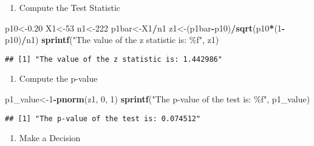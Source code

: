 \documentclass[
]{article}
\newenvironment{Shaded}{\begin{snugshade}}{\end{snugshade}}
\newcommand{\DecValTok}[1]{\textcolor[rgb]{0.00,0.00,0.81}{#1}}
\newcommand{\FloatTok}[1]{\textcolor[rgb]{0.00,0.00,0.81}{#1}}
\newcommand{\FunctionTok}[1]{\textcolor[rgb]{0.13,0.29,0.53}{\textbf{#1}}}
\newcommand{\NormalTok}[1]{#1}
\newcommand{\OtherTok}[1]{\textcolor[rgb]{0.56,0.35,0.01}{#1}}
\newcommand{\SpecialCharTok}[1]{\textcolor[rgb]{0.81,0.36,0.00}{\textbf{#1}}}
\newcommand{\StringTok}[1]{\textcolor[rgb]{0.31,0.60,0.02}{#1}}
\providecommand{\tightlist}{%
  \setlength{\itemsep}{0pt}\setlength{\parskip}{0pt}}
\begin{document}
\begin{enumerate}
\def\labelenumi{\arabic{enumi}.}
\setcounter{enumi}{1}
\tightlist
\item
  Compute the Test Statistic
\end{enumerate}

\begin{Shaded}
\begin{Highlighting}[]
\NormalTok{p10}\OtherTok{\textless{}{-}}\FloatTok{0.20}
\NormalTok{X1}\OtherTok{\textless{}{-}}\DecValTok{53}
\NormalTok{n1}\OtherTok{\textless{}{-}}\DecValTok{222}
\NormalTok{p1bar}\OtherTok{\textless{}{-}}\NormalTok{X1}\SpecialCharTok{/}\NormalTok{n1}
\NormalTok{z1}\OtherTok{\textless{}{-}}\NormalTok{(p1bar}\SpecialCharTok{{-}}\NormalTok{p10)}\SpecialCharTok{/}\FunctionTok{sqrt}\NormalTok{(p10}\SpecialCharTok{*}\NormalTok{(}\DecValTok{1}\SpecialCharTok{{-}}\NormalTok{p10)}\SpecialCharTok{/}\NormalTok{n1)}
\FunctionTok{sprintf}\NormalTok{(}\StringTok{"The value of the z statistic is: \%f"}\NormalTok{, z1)}
\end{Highlighting}
\end{Shaded}

\begin{verbatim}
## [1] "The value of the z statistic is: 1.442986"
\end{verbatim}

\begin{enumerate}
\def\labelenumi{\arabic{enumi}.}
\setcounter{enumi}{2}
\tightlist
\item
  Compute the p-value
\end{enumerate}

\begin{Shaded}
\begin{Highlighting}[]
\NormalTok{p1\_value}\OtherTok{\textless{}{-}}\DecValTok{1}\SpecialCharTok{{-}}\FunctionTok{pnorm}\NormalTok{(z1, }\DecValTok{0}\NormalTok{, }\DecValTok{1}\NormalTok{)}
\FunctionTok{sprintf}\NormalTok{(}\StringTok{"The p{-}value of the test is: \%f"}\NormalTok{, p1\_value)}
\end{Highlighting}
\end{Shaded}

\begin{verbatim}
## [1] "The p-value of the test is: 0.074512"
\end{verbatim}

\begin{enumerate}
\def\labelenumi{\arabic{enumi}.}
\setcounter{enumi}{3}
\tightlist
\item
  Make a Decision
\end{enumerate}
\end{document}
